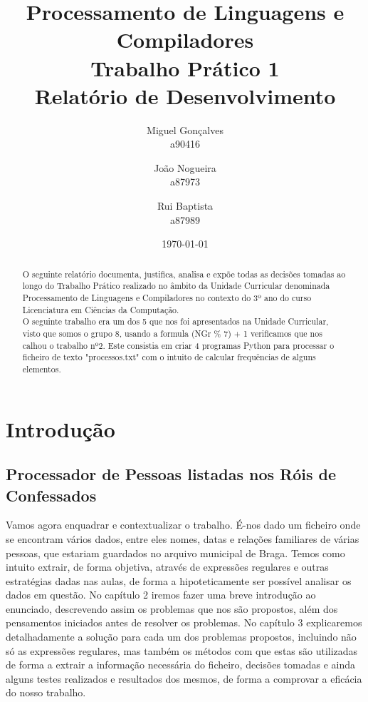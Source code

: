 \documentclass[11pt,a4paper]{report}%
\title{Processamento de Linguagens e Compiladores\\
       \textbf{Trabalho Prático 1}\\ Relatório de Desenvolvimento
       } %
\author{Miguel Gonçalves\\ a90416 \and João Nogueira\\ a87973
         \and Rui Baptista\\ a87989
       } %
\date{\today} %
\def\titulo#1{\section{#1}}    %
\begin{document}
\maketitle %

\begin{abstract}  %
O seguinte relatório documenta, justifica, analisa e expõe todas as decisões tomadas ao longo do Trabalho Prático realizado no âmbito da Unidade Curricular denominada Processamento de Linguagens e Compiladores no contexto do 3º ano do curso Licenciatura em Ciências da Computação.\\
O seguinte trabalho era um dos 5 que nos foi apresentados na Unidade Curricular, visto que somos o grupo 8,
usando a formula (NGr \% 7) + 1 verificamos que nos calhou o trabalho nº2. Este consistia em criar 4 programas Python para processar o ficheiro de texto "processos.txt"
com o intuito de calcular frequências de alguns elementos.\\
\end{abstract}

\tableofcontents %

\chapter{Introdução} \label{chap:intro} %
\titulo{Processador de Pessoas listadas nos Róis de Confessados}

Vamos agora enquadrar e contextualizar o trabalho.
É-nos dado um ficheiro onde se encontram vários dados, entre eles nomes, datas e relações familiares de várias pessoas, que estariam guardados no arquivo municipal de Braga.
Temos como intuito extrair, de forma objetiva, através de expressões regulares e outras estratégias dadas nas aulas, de forma a hipoteticamente ser possível analisar os dados em questão.
No capítulo 2 iremos fazer uma breve introdução ao enunciado, descrevendo assim os problemas que nos são propostos, além dos pensamentos iniciados antes de resolver os problemas.
No capítulo 3 explicaremos detalhadamente a solução para cada um dos problemas propostos, incluindo não só as expressões regulares, mas também os métodos com que estas são utilizadas de forma a extrair a informação necessária do ficheiro, decisões tomadas e ainda alguns testes realizados e resultados dos mesmos, de forma a comprovar a eficácia do nosso trabalho.
\end{document}
